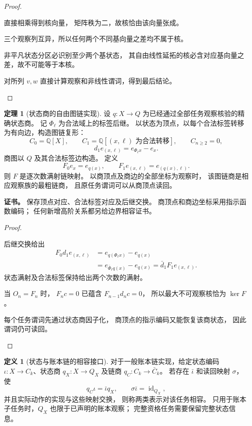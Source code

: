 \documentclass[UTF8,12pt,a4paper,openany,fontset=none,zihao=false]{ctexrep}
\theoremstyle{definition}
\newtheorem{definition}{定义}[chapter]
\newtheorem{theorem}{定理}[chapter]
\newenvironment{certificate}{\par\noindent\textbf{证书。}\ignorespaces}{\par}
\newcommand{\1}{\mathbf 1}
\begin{document}
\begin{proof}
\begin{semanticsteps}
\item 直接相乘得到核向量，
矩阵秩为二，故核恰由该向量张成。
\item 三个观察列互异，所以任何两个不同基向量之差均不属于核。
\item 非平凡状态分区必识别至少两个基状态，
其自由线性延拓的核必含对应基向量之差，故不可能等于本核。
\item 对所列 \(v,w\) 直接计算观察和非线性谓词，得到最后结论。
\end{semanticsteps}
\end{proof}
\begin{theorem}[状态商的自由图链实现]
\label{ch:graph-realization}
设 \(q:X\to Q\) 为已经通过全部任务观察核验的精确状态商。
记 \(\Phi_\ell\) 为合法域上的标签后继。
以状态为顶点，以每个合法标签转移为有向边，构造图链复形：
\[
C_0=\mathbb Q[X],\qquad
C_1=\mathbb Q[(x,\ell)\text{ 为合法转移}],\qquad
C_{n\ge2}=0,
\]
\[
d_1e_{(x,\ell)}
=e_{\Phi_\ell x}-e_x.
\]
商图以 \(Q\) 及其合法标签边构造。
定义
\[
F_0e_x=e_{q(x)},\qquad
F_1e_{(x,\ell)}=e_{(q(x),\ell)}.
\]
则 \(F\) 是逐次数满射链映射。
以商顶点及商边的全部坐标为观察时，
该图链商是相应观察族的最粗链商，
且原任务谓词可以从商顶点读回。
\end{theorem}
\begin{certificate}
保存顶点对应、合法标签对应及后继交换。
商顶点和商边坐标采用指示函数编码；
任何新增高阶关系都另给边界相容证书。
\end{certificate}
\begin{proof}
\begin{semanticsteps}
\item 后继交换给出
\[
\begin{aligned}
F_0d_1e_{(x,\ell)}
&=e_{q(\Phi_\ell x)}-e_{q(x)}\\
&=e_{\bar\Phi_\ell q(x)}-e_{q(x)}
=\bar d_1F_1e_{(x,\ell)}.
\end{aligned}
\]
状态满射及合法标签保持给出两个次数的满射。
\item 当 \(O_n=F_n\) 时，
\(F_n c=0\) 已蕴含 \(F_{n-1}d_nc=0\)，
所以最大不可观察核恰为 \(\ker F\)。
\item 每个任务谓词先通过状态商因子化，
商顶点的指示编码又能恢复该商状态，
因此谓词仍可读回。
\end{semanticsteps}
\end{proof}
\begin{definition}[状态与账本链的相容接口]
\label{ch:interface}
对于一般账本链实现，给定状态编码
\(\iota:X\to C_k\)、状态商 \(q_X:X\to Q_X\)
及链商 \(q_C:C_k\to\bar C_k\)。
若存在 \(\bar\iota\) 和读回映射 \(\sigma\)，使
\[
q_C\iota=\bar\iota q_X,\qquad
\sigma\bar\iota=\operatorname{id}_{Q_X},
\]
并且实际动作的实现与这些映射交换，
则称两类表示对该任务相容。
只用于账本子任务时，\(Q_X\) 也限于已声明的账本观察；
完整资格任务需要保留完整状态信息。
\end{definition}
\end{document}
